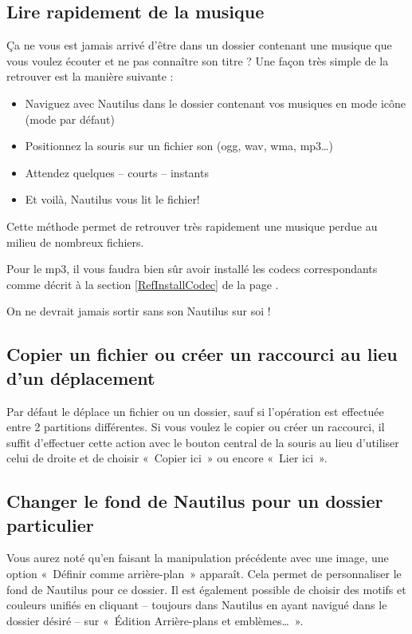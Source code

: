 \subsection{Lire rapidement de la musique}
Ça ne vous est jamais arrivé d'être dans un dossier contenant une musique que vous voulez écouter et ne pas connaître son titre ? Une façon très simple de la retrouver est la manière suivante :\par
\begin{itemize}
\item Naviguez avec Nautilus dans le dossier contenant vos musiques en mode icône (mode par défaut)
\item Positionnez la souris sur un fichier son (ogg, wav, wma, mp3\ldots{})
\item Attendez quelques -- courts -- instants
\item Et voilà, Nautilus vous lit le fichier!
\end{itemize}
Cette méthode permet de retrouver très rapidement une musique perdue au milieu de nombreux fichiers.
\begin{nota}
Pour le mp3, il vous faudra bien sûr avoir installé les codecs correspondants comme décrit à la section \ref{RefInstallCodec} de la page \pageref{RefInstallCodec}.
\end{nota}
On ne devrait jamais sortir sans son Nautilus sur soi !
\subsection{Copier un fichier ou créer un raccourci au lieu d'un déplacement}
Par défaut le  déplace un fichier ou un dossier, sauf si l'opération est effectuée entre 2 partitions différentes. Si vous voulez le copier ou créer un raccourci, il suffit d'effectuer cette action avec le bouton central de la souris au lieu d'utiliser celui de droite et de choisir «~Copier ici~» ou encore «~Lier ici~».
\subsection{Changer le fond de Nautilus pour un dossier particulier}
\label{RefNautilusEmblemeFondDossier}
Vous aurez noté qu'en faisant la manipulation précédente avec une image, une option «~Définir comme arrière-plan~» apparaît. Cela permet de personnaliser le fond de Nautilus pour ce dossier. Il est également possible de choisir des motifs et couleurs unifiés en cliquant -- toujours dans Nautilus en ayant navigué dans le dossier désiré -- sur «~Édition \FlecheDroite Arrière-plans et emblèmes\ldots{}~».
